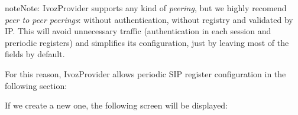\documentclass[letterpaper,10pt,english]{sphinxmanual}
\begin{document}
\begin{notice}{note}{Note:}
IvozProvider supports any kind of \emph{peering}, but we highly recomend
\emph{peer to peer peerings}: without authentication, without registry and
validated by IP. This will avoid unnecessary traffic (authentication in each
session and preriodic registers) and simplifies its configuration, just by
leaving most of the fields by default.
\end{notice}

For this reason, IvozProvider allows periodic SIP register configuration in the
following section:

\noindent{}

If we create a new one, the following screen will be displayed:

\noindent{}
\end{document}

